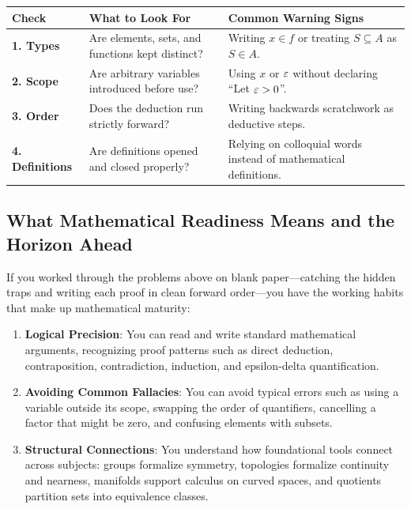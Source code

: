 \begin{center}
\small
\renewcommand{\arraystretch}{1.25}
\begin{tabular}{p{3.0cm}p{5.8cm}p{5.8cm}}
\hline
\textbf{Check} & \textbf{What to Look For} & \textbf{Common Warning Signs} \\
\hline
\textbf{1. Types} & Are elements, sets, and functions kept distinct? & Writing $x \in f$ or treating $S \subseteq A$ as $S \in A$. \\
\textbf{2. Scope} & Are arbitrary variables introduced before use? & Using $x$ or $\varepsilon$ without declaring ``Let $\varepsilon > 0$''. \\
\textbf{3. Order} & Does the deduction run strictly forward? & Writing backwards scratchwork as deductive steps. \\
\textbf{4. Definitions} & Are definitions opened and closed properly? & Relying on colloquial words instead of mathematical definitions. \\
\hline
\end{tabular}
\end{center}

\subsection{What Mathematical Readiness Means and the Horizon Ahead}

If you worked through the problems above on blank paper---catching the hidden traps and writing each proof in clean forward order---you have the working habits that make up mathematical maturity:
\begin{enumerate}
  \item \textbf{Logical Precision}: You can read and write standard mathematical arguments, recognizing proof patterns such as direct deduction, contraposition, contradiction, induction, and epsilon-delta quantification.
  \item \textbf{Avoiding Common Fallacies}: You can avoid typical errors such as using a variable outside its scope, swapping the order of quantifiers, cancelling a factor that might be zero, and confusing elements with subsets.
  \item \textbf{Structural Connections}: You understand how foundational tools connect across subjects: groups formalize symmetry, topologies formalize continuity and nearness, manifolds support calculus on curved spaces, and quotients partition sets into equivalence classes.
\end{enumerate}

